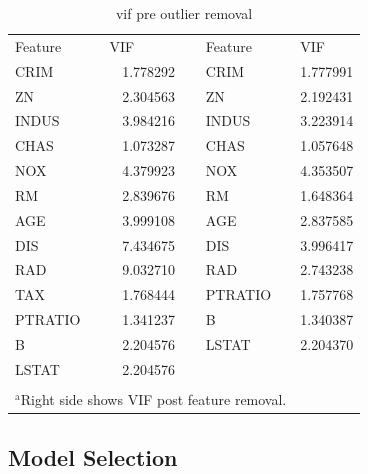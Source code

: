 \documentclass[conference, 11pt]{IEEEtran}
\begin{document}
\begin{table}[htbp]
  \centering
  \caption{vif pre outlier removal}
    \begin{tabular}{lrrrr}
    Feature & \multicolumn{1}{l}{VIF} &       & \multicolumn{1}{l}{Feature} & \multicolumn{1}{l}{VIF} \\
\cmidrule{1-2}\cmidrule{4-5}    CRIM  & 1.778292 &       & \multicolumn{1}{l}{CRIM} & 1.777991 \\
    ZN    & 2.304563 &       & \multicolumn{1}{l}{ZN} & 2.192431 \\
    INDUS & 3.984216 &       & \multicolumn{1}{l}{INDUS} & 3.223914 \\
    CHAS  & 1.073287 &       & \multicolumn{1}{l}{CHAS} & 1.057648 \\
    NOX   & 4.379923 &       & \multicolumn{1}{l}{NOX} & 4.353507 \\
    RM    & 2.839676 &       & \multicolumn{1}{l}{RM} & 1.648364 \\
    AGE   & 3.999108 &       & \multicolumn{1}{l}{AGE} & 2.837585 \\
    DIS   & 7.434675 &       & \multicolumn{1}{l}{DIS} & 3.996417 \\
    RAD   & 9.032710 &       & \multicolumn{1}{l}{RAD} & 2.743238 \\
    TAX   & 1.768444 &       & \multicolumn{1}{l}{PTRATIO} & 1.757768 \\
    PTRATIO & 1.341237 &       & \multicolumn{1}{l}{B} & 1.340387 \\
    B & 2.204576 &       & \multicolumn{1}{l}{LSTAT} & 2.204370 \\
    LSTAT & 2.204576 &       &       &  \\
          &       &       &       &  \\
    \multicolumn{4}{l}{$^{\mathrm{a}}$Right side shows VIF post feature removal.}
    \end{tabular}%
  \label{table:vif2}%
\end{table}%

\subsection{Model Selection}
\end{document}
